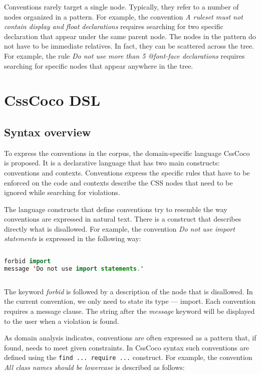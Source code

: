 Conventions rarely target a single node. Typically, they refer to a number of
nodes organized in a pattern. For example, the convention \textit{A ruleset
must not contain display and float declarations} requires searching for two
specific declaration that appear under the same parent node. The nodes in the
pattern do not have to be immediate relatives. In fact, they can be scattered
across the tree. For example, the rule \textit{Do not use more than 5
@font-face declarations} requires searching for specific nodes that appear
anywhere in the tree.

\section{CssCoco DSL}

\subsection{Syntax overview}

To express the conventions in the corpus, the domain-specific language CssCoco
is proposed. It is a declarative language that has two main constructs:
conventions and contexts. Conventions express the specific rules that have to
be enforced on the code and contexts describe the CSS nodes that need to be
ignored while searching for violations.

The language constructs that define conventions try to resemble the way
conventions are expressed in natural text. There is a construct that describes
directly what is disallowed. For example, the convention \textit{Do not use
import statements} is expressed in the following way:

\begin{sourcecode}
\begin{lstlisting}[style=mono,language=Java]
forbid import
message 'Do not use import statements.'
\end{lstlisting}
\end{sourcecode}

The keyword \textit{forbid} is followed by a description of the node that is
disallowed. In the current convention, we only need to state its type ---
import. Each convention requires a message clause. The string after the
\textit{message} keyword will be displayed to the user when a violation is
found.

As domain analysis indicates, conventions are often expressed as a pattern that, if found, needs to
meet given constraints. In CssCoco syntax such conventions are defined using the \texttt{find ...
require ...} construct. For example, the convention \textit{All class names should be lowercase} is
described as follows:

